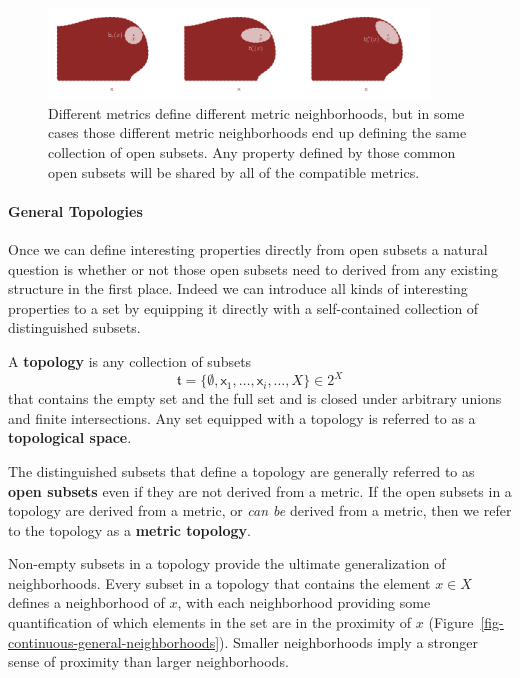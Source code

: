 \documentclass[
  letterpaper,
  DIV=11,
  numbers=noendperiod]{scrartcl}
\let\oldparagraph\paragraph
\renewcommand{\paragraph}[1]{\oldparagraph{#1}\mbox{}}
\begin{document}
\begin{figure}

{\centering \includegraphics[width=0.9\textwidth,height=\textheight]{figures/structures/metric_topology/equivalent_open_subsets/equivalent_open_subsets.pdf}

}

\caption{\label{fig-equivalent-open-subsets}Different metrics define
different metric neighborhoods, but in some cases those different metric
neighborhoods end up defining the same collection of open subsets. Any
property defined by those common open subsets will be shared by all of
the compatible metrics.}

\end{figure}

\hypertarget{sec:general-topology}{%
\paragraph{General Topologies}\label{sec:general-topology}}

Once we can define interesting properties directly from open subsets a
natural question is whether or not those open subsets need to derived
from any existing structure in the first place. Indeed we can introduce
all kinds of interesting properties to a set by equipping it directly
with a self-contained collection of distinguished subsets.

A \textbf{topology} is any collection of subsets \[
\mathfrak{t}
= \{ \emptyset, \mathsf{x}_{1}, \ldots, \mathsf{x}_{i}, \ldots, X \} \in 2^{X}
\] that contains the empty set and the full set and is closed under
arbitrary unions and finite intersections. Any set equipped with a
topology is referred to as a \textbf{topological space}.

The distinguished subsets that define a topology are generally referred
to as \textbf{open subsets} even if they are not derived from a metric.
If the open subsets in a topology are derived from a metric, or
\emph{can be} derived from a metric, then we refer to the topology as a
\textbf{metric topology}.

Non-empty subsets in a topology provide the ultimate generalization of
neighborhoods. Every subset in a topology that contains the element
\(x \in X\) defines a neighborhood of \(x\), with each neighborhood
providing some quantification of which elements in the set are in the
proximity of \(x\) (Figure~\ref{fig-continuous-general-neighborhoods}).
Smaller neighborhoods imply a stronger sense of proximity than larger
neighborhoods.
\end{document}
